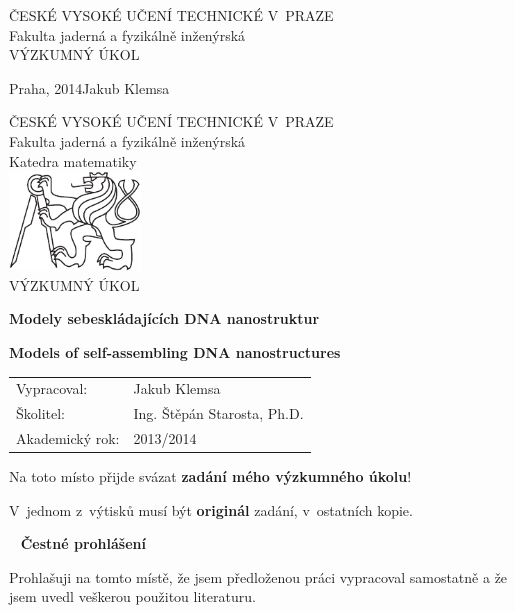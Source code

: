 \documentclass[a4paper, 11pt]{report}
\theoremstyle{definition}
\theoremstyle{remark}
\newcommand{\cvut}{ČESKÉ VYSOKÉ UČENÍ TECHNICKÉ V~PRAZE}
\newcommand{\fjfi}{Fakulta jaderná a fyzikálně inženýrská}
\newcommand{\km}{Katedra matematiky}
\newcommand{\TYPPRACE}{VÝZKUMNÝ ÚKOL}
\newcommand{\mePrace}{mého výzkumného úkolu}
\newcommand{\nazevcz}{Modely sebeskládajících DNA nanostruktur}
\newcommand{\nazeven}{Models of self-assembling DNA nanostructures}
\newcommand{\autor}{Jakub Klemsa}
\newcommand{\vedouci}{Ing. Štěpán Starosta, Ph.D.}
\newcommand{\rok}{2014}
\newcommand{\akadRok}{2013/2014}
\newcommand{\misto}{Praha}
\begin{document}
\begin{titlepage}

\thispagestyle{empty}
\begin{center}
	{\Large \cvut \\[12pt] \fjfi \\[260pt]}
	{\Huge \TYPPRACE}
\end{center}
\vfill
{
	\Large \misto, \rok \hfill \autor
}
\newpage


\thispagestyle{empty}
\begin{center}
	{\Large \cvut \\[10pt] \fjfi \\[10pt] \km \\[40pt]}
	\includegraphics[height=75pt]{lev.pdf} \\[100pt]
	
	{\LARGE \TYPPRACE \\[60pt]}
	
	{\Large\bf \nazevcz \\[30pt]}
	
	{\Large\bf \nazeven}
\end{center}
\vfill
{
	\Large
	\begin{tabular}{ll}
	Vypracoval: & \autor\\[3pt]
	Školitel: & \vedouci\\[3pt]
	Akademický rok: & \akadRok
	\end{tabular}
}
\newpage


\thispagestyle{empty}
\Large
Na toto místo přijde svázat \textbf{zadání \mePrace}!

\vspace{4mm}
V~jednom z~výtisků musí být \textbf{originál} zadání, v~ostatních kopie.
\normalsize
\newpage


\thispagestyle{empty}
~
\vfill
\noindent\textbf{Čestné prohlášení}
\vspace{0.5cm}

\noindent
Prohlašuji na tomto místě, že jsem předloženou práci vypracoval samostatně a že jsem uvedl veškerou použitou literaturu.
\vspace{1.5cm}


\end{titlepage}
\end{document}
